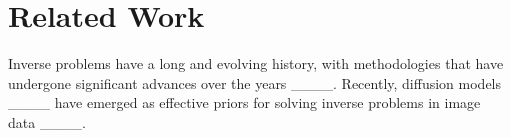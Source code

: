\section{Related Work}
\label{sec:related}

Inverse problems have a long and evolving history, with methodologies that have undergone significant advances over the years ____.
Recently, diffusion models ____ have emerged as effective priors for solving inverse problems in image data ____. 


